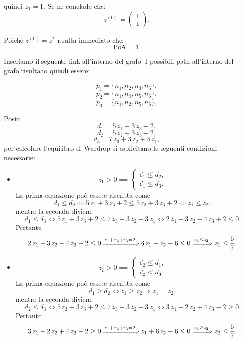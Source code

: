 \begin{alphaparts}
    quindi \(z_1 = 1.\) Se ne conclude che:
    \[ z^{(0)} = \begin{pmatrix}
        1 \\ 1
    \end{pmatrix}.\]

    Poiché \(z^{(0)} = z^*\) risulta immediato che:
    \[\text{PoA} = 1.\]

    \questionpart
   Inseriamo il seguente link all'interno del grafo:
    I possibili path all'interno del grafo risultano quindi essere:

    \[p_1 = \{n_1, n_2, n_3, n_6\},\]
    \[p_2 = \{n_1, n_4, n_5, n_6\},\]
    \[p_3 = \{n_1, n_2, n_5, n_6\},\]

    Posto
    \[d_1 = 5\,z_1+3\,z_3 +2,\]
    \[d_2 = 5\,z_2+3\,z_3 +2,\]
    \[d_3 = 7\,z_3+3\,z_2 +3\,z_1,\]
     per calcolare l'equilibro di Wardrop si esplicitano le seguenti condizioni necessarie:
\begin{itemize}
    \item\[z_1 > 0 \implies \begin{cases} d_1 \le d_2, \\ d_1 \le d_3. \end{cases} \]
    La prima equazione può essere riscritta come
    \[d_1 \le d_2 \Leftrightarrow 5\,z_1+3\,z_3 +2 \le 5\,z_2+3\,z_3 +2 \Leftrightarrow z_1 \le z_2, \]
    mentre la seconda diviene
    \[d_1 \le d_3 \Leftrightarrow 5\,z_1+3\,z_3 +2 \le 7\,z_3+3\,z_2 +3\,z_1 \Leftrightarrow  
    2\,z_1 -3\,z_2 -4\,z_3 +2 \le 0.\]
    Pertanto
    \[2\,z_1 -3\,z_2 -4\,z_3 +2 \le 0\xRightarrow[]{z_1+ z_2 + z_3= 2} 6\,z_1 + z_2 -6 \le 0\xRightarrow[]{z_1 \le z_2} z_1 \le \frac{6}{7}.\]
    
    \item \[z_2 > 0 \implies \begin{cases} d_2 \le d_1, \\ d_2 \le d_3. \end{cases} \]
     La prima equazione può essere riscritta come
    \[d_1 \ge d_2 \Leftrightarrow z_1 \ge z_2 \Rightarrow z_1 = z_2, \]
    mentre la seconda diviene
    \[d_2 \le d_3 \Leftrightarrow 5\,z_2+3\,z_3 +2 \le 7\,z_3+3\,z_2 +3\,z_1 \Leftrightarrow  
    3\,z_1 -2\,z_2 +4\,z_3 -2 \ge 0.\]
    Pertanto
    \[3\,z_1 -2\,z_2 +4\,z_3 -2 \ge 0\xRightarrow[]{z_1+ z_2 + z_3= 2} z_1 + 6\,z_2 -6 \le 0\xRightarrow[]{z_1 \ge z_2} z_2 \le \frac{6}{7}.\]
    

\end{itemize}
\end{alphaparts}
